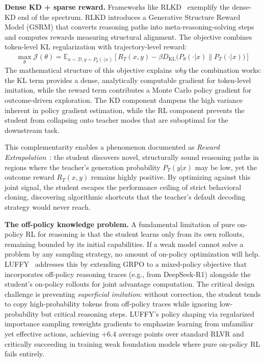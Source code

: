 \documentclass{article} %
\newcommand{\KL}{D_{\mathrm{KL}}}
\begin{document}
\textbf{Dense KD + sparse reward.}
Frameworks like RLKD~\citep{2505.16142} exemplify the dense-KD end of the spectrum. RLKD introduces a Generative Structure Reward Model (GSRM) that converts reasoning paths into meta-reasoning-solving steps and computes rewards measuring structural alignment. The objective combines token-level KL regularization with trajectory-level reward:
\begin{align}
\max_{\theta} \mathcal{J}(\theta) = \mathbb{E}_{x \sim \mathcal{D}, y \sim P_\theta(\cdot|x)} \left[ R_T(x, y) - \beta \KL\big(P_\theta(\cdot|x) \parallel P_T(\cdot|x)\big) \right] \label{eq:rlkd}
\end{align}
The mathematical structure of this objective explains \emph{why} the combination works: the KL term provides a dense, analytically computable gradient for token-level imitation, while the reward term contributes a Monte Carlo policy gradient for outcome-driven exploration. The KD component dampens the high variance inherent in policy gradient estimation, while the RL component prevents the student from collapsing onto teacher modes that are suboptimal for the downstream task.

This complementarity enables a phenomenon documented as \emph{Reward Extrapolation}~\citep{2602.12125}: the student discovers novel, structurally sound reasoning paths in regions where the teacher's generation probability $P_T(y|x)$ may be low, yet the outcome reward $R_T(x, y)$ remains highly positive. By optimizing against this joint signal, the student escapes the performance ceiling of strict behavioral cloning, discovering algorithmic shortcuts that the teacher's default decoding strategy would never reach.

\textbf{The off-policy knowledge problem.}
A fundamental limitation of pure on-policy RL for reasoning is that the student learns only from its own rollouts, remaining bounded by its initial capabilities. If a weak model cannot solve a problem by any sampling strategy, no amount of on-policy optimization will help. LUFFY~\citep{2504.14945} addresses this by extending GRPO to a mixed-policy objective that incorporates off-policy reasoning traces (e.g., from DeepSeek-R1) alongside the student's on-policy rollouts for joint advantage computation. The critical design challenge is preventing \emph{superficial imitation}: without correction, the student tends to copy high-probability tokens from off-policy traces while ignoring low-probability but critical reasoning steps. LUFFY's policy shaping via regularized importance sampling reweights gradients to emphasize learning from unfamiliar yet effective actions, achieving +6.4 average points over standard RLVR and critically succeeding in training weak foundation models where pure on-policy RL fails entirely.
\end{document}
